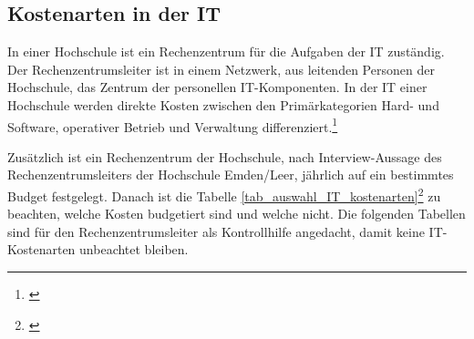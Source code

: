 
\subsection{Kostenarten in der IT}
In einer Hochschule ist ein Rechenzentrum für die Aufgaben der IT zuständig.
Der Rechenzentrumsleiter ist in einem Netzwerk, aus leitenden Personen der Hochschule, das Zentrum der personellen IT-Komponenten. In der IT einer Hochschule werden direkte Kosten zwischen den Primärkategorien Hard- und Software, operativer Betrieb und Verwaltung differenziert.\footnote{\autocite[494]{hansen_business_2009}}

Zusätzlich ist ein Rechenzentrum der Hochschule, nach Interview-Aussage des Rechenzentrumsleiters der Hochschule Emden/Leer, jährlich auf ein bestimmtes Budget festgelegt. Danach ist die Tabelle \ref{tab_auswahl_IT_kostenarten}\footnote{\autocite[493-498]{hansen_business_2009}} zu beachten, welche Kosten budgetiert sind und welche nicht. Die folgenden Tabellen sind für den Rechenzentrumsleiter als Kontrollhilfe angedacht, damit keine IT-Kostenarten unbeachtet bleiben.

